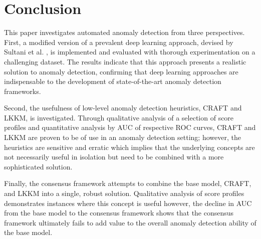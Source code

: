 \documentclass[sigplan,authorversion,nonacm, 9pt]{acmart}
\begin{document}
\section{Conclusion}
This paper investigates automated anomaly detection from three perspectives. First, a modified version of a prevalent deep learning approach, devised by Sultani et al. \cite{sultani}, is implemented and evaluated with thorough experimentation on a challenging dataset. The results indicate that this approach presents a realistic solution to anomaly detection, confirming that deep learning approaches are indispensable to the development of state-of-the-art anomaly detection frameworks.
\par
Second, the usefulness of low-level anomaly detection heuristics, CRAFT and LKKM, is investigated. Through qualitative analysis of a selection of score profiles and quantitative analysis by AUC of respective ROC curves, CRAFT and LKKM are proven to be of use in an anomaly detection setting; however, the heuristics are sensitive and erratic which implies that the underlying concepts are not necessarily useful in isolation but need to be combined with a more sophisticated solution.
\par
Finally, the consensus framework attempts to combine the base model, CRAFT, and LKKM into a single, robust solution. Qualitative analysis of score profiles demonstrates instances where this concept is useful however, the decline in AUC from the base model to the consensus framework shows that the consensus framework ultimately fails to add value to the overall anomaly detection ability of the base model. 
\end{document}
